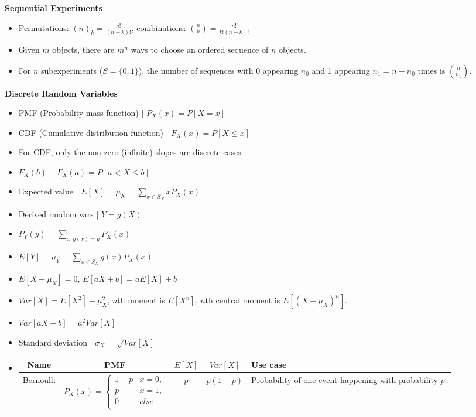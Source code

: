 \documentclass[8pt]{article}
\begin{document}
\textbf{Sequential Experiments}
\begin{itemize}
    \item Permutations: $(n)_k = \frac{n!}{(n - k)!}$, combinations: ${n \choose k} = \frac{n!}{k!(n - k)!}$
    \item Given $m$ objects, there are $m^n$ ways to choose an ordered sequence of $n$ objects.
    \item For $n$ subexperiments ($S = \{ 0, 1 \}$), the number of sequences with 0 appearing $n_0$ and 1 appearing $n_1 = n - n_0$ times is ${n \choose n_1}$.
\end{itemize}
\textbf{Discrete Random Variables}
\begin{itemize}
    \item PMF (Probability mass function) | $P_X(x) = P[X = x]$
    \item CDF (Cumulative distribution function) | $F_X(x) = P[X \leq x]$
    \item For CDF, only the non-zero (infinite) slopes are discrete cases.
    \item $F_X(b) - F_X(a) = P[a < X \leq b]$
    \item Expected value | $E[X] = \mu_X = \sum_{x \in S_X} xP_X(x)$
    \item Derived random vars | $Y = g(X)$
    \item $P_Y(y) = \sum_{x:g(x) = y} P_X(x)$
    \item $E[Y] = \mu_Y = \sum_{x \in S_X} g(x) P_X(x)$
    \item $E[X - \mu_X] = 0$, $E[aX + b] = aE[X] + b$
    \item $Var[X] = E[X^2] - \mu_X^2$, $n$th moment is $E[X^n]$, $n$th central moment is $E[(X - \mu_X)^n]$.
    \item $Var[aX + b] = a^2 Var[X]$
    \item Standard deviation | $\sigma_X = \sqrt{Var[X]}$
    \item
    \begin{tabular}{|c|c|c|c|p{4cm}|}
        \hline
        Name & PMF & $E[X]$ & $Var[X]$ & Use case \\
        \hline
        Bernoulli & $P_X(x) = \begin{cases}
            1 - p & x = 0, \\
            p & x = 1, \\
            0 & else \\
        \end{cases}$ & $p$ & $p(1 - p)$ & Probability of one event happening with probability $p$. \\

\end{tabular}
\end{itemize}
\end{document}
